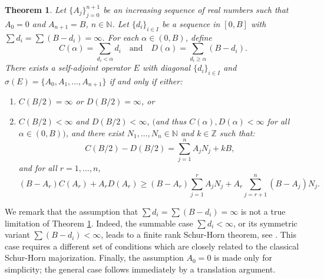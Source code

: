 \documentclass[12pt]{amsart}
\newcounter{Theorem}
\numberwithin{equation}{section}
\numberwithin{Theorem}{section}
\theoremstyle{plain}
\newtheorem{thm}[Theorem]{Theorem}
\theoremstyle{definition}
\theoremstyle{remark}
\begin{document}
\begin{thm}\label{npt} Let $\{A_j\}_{j=0}^{n+1}$ be an increasing sequence of real numbers such that $A_0=0$ and $A_{n+1}=B$, $n\in {\mathbb{N}}$. Let $\{d_{i}\}_{i\in I}$ be a sequence in $[0,B]$ with $\sum d_{i} = \sum (B-d_{i}) = \infty$. For each $\alpha \in (0,B)$, define
\begin{equation}\label{conv}
C(\alpha) = \sum_{d_{i}<\alpha}d_{i}\quad\text{and}\quad D(\alpha)=\sum_{d_{i}\geq \alpha}(B-d_{i}).
\end{equation}
There exists a self-adjoint operator $E$ with diagonal $\{d_{i}\}_{i\in I}$ and $\sigma(E) = \{A_0, A_1, \ldots, A_{n+1}\}$ if and only if  either:
\begin{enumerate}
\item $C(B/2)=\infty$ or $D(B/2)=\infty$, or 
\item $C(B/2)<\infty$ and $D(B/2)<\infty$, $($and thus $C(\alpha), D(\alpha)< \infty$ for all $\alpha \in (0,B)$$)$, and there exist $N_1, \ldots, N_n \in{\mathbb{N}}$ and $k\in{\mathbb{Z}}$ such that:
\begin{equation}\label{npttrace} 
C(B/2)-D(B/2) = \sum_{j=1}^n A_j N_j+kB,
\end{equation}
and for all $r=1,\ldots, n$,
\begin{equation}
\label{nptmaj} (B-A_r)C(A_r)+A_r D(A_r) \geq (B-A_r)\sum_{j=1}^r A_j N_j +  A_r\sum_{j=r+1}^n (B-A_j)N_j.
\end{equation}
\end{enumerate}
\end{thm}

We remark that the assumption that $\sum d_{i} = \sum (B-d_{i}) = \infty$ is not a true limitation of Theorem \ref{npt}. Indeed, the summable case $\sum d_{i}<\infty$, or its symmetric variant  $\sum (B-d_{i})<\infty$, leads to a finite rank Schur-Horn theorem, see \cite[Theorems 2.1 and 2.2]{mbjj3}. This case requires a different set of conditions which are closely related to the classical Schur-Horn majorization. Finally, the assumption $A_0=0$ is made only for simplicity; the general case follows immediately by a translation argument.
\end{document}
